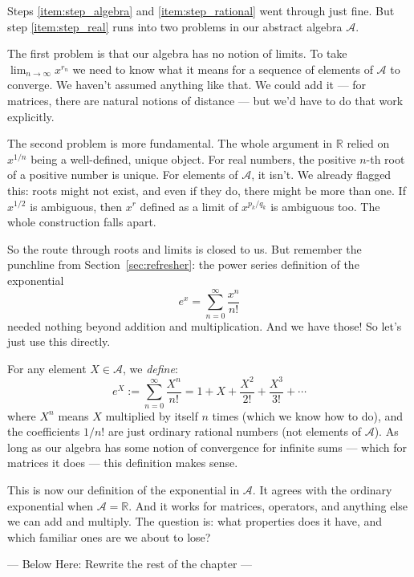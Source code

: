 Steps \ref{item:step_algebra} and \ref{item:step_rational} went through just fine. But step \ref{item:step_real} runs into two problems in our abstract algebra $\mathcal{A}$.

The first problem is that our algebra has no notion of limits. To take $\lim_{n \to \infty} x^{r_n}$ we need to know what it means for a sequence of elements of $\mathcal{A}$ to converge. We haven't assumed anything like that. We could add it --- for matrices, there are natural notions of distance --- but we'd have to do that work explicitly.

The second problem is more fundamental. The whole argument in $\mathbb{R}$ relied on $x^{1/n}$ being a well-defined, unique object. For real numbers, the positive $n$-th root of a positive number is unique. For elements of $\mathcal{A}$, it isn't. We already flagged this: roots might not exist, and even if they do, there might be more than one. If $x^{1/2}$ is ambiguous, then $x^r$ defined as a limit of $x^{p_k/q_k}$ is ambiguous too. The whole construction falls apart.

So the route through roots and limits is closed to us. But remember the punchline from Section~\ref{sec:refresher}: the power series definition of the exponential
\begin{equation}
    e^x = \sum_{n=0}^{\infty} \frac{x^n}{n!}
\end{equation}
needed nothing beyond addition and multiplication. And we have those! So let's just use this directly.

For any element $X \in \mathcal{A}$, we \emph{define}:
\begin{equation}
    \label{eq:exponential_power_series}
    e^X := \sum_{n=0}^{\infty} \frac{X^n}{n!} = 1 + X + \frac{X^2}{2!} + \frac{X^3}{3!} + \cdots
\end{equation}
where $X^n$ means $X$ multiplied by itself $n$ times (which we know how to do), and the coefficients $1/n!$ are just ordinary rational numbers (not elements of $\mathcal{A}$). As long as our algebra has some notion of convergence for infinite sums --- which for matrices it does --- this definition makes sense.

This is now our definition of the exponential in $\mathcal{A}$. It agrees with the ordinary exponential when $\mathcal{A} = \mathbb{R}$. And it works for matrices, operators, and anything else we can add and multiply. The question is: what properties does it have, and which familiar ones are we about to lose?


--- Below Here: Rewrite the rest of the chapter ---


